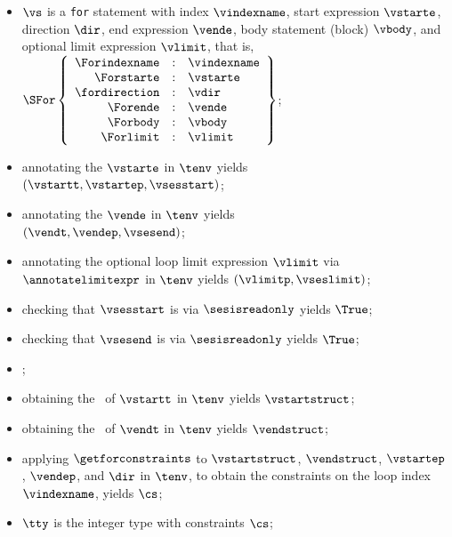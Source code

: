 \ProseParagraph
\AllApply
\begin{itemize}
  \item $\vs$ is a \texttt{for} statement with index $\vindexname$,
        start expression $\vstarte$,
        direction $\dir$,
        end expression $\vende$,
        body statement (block) $\vbody$,
        and optional limit expression $\vlimit$,
        that is, $\SFor\left\{\begin{array}{rcl}
          \Forindexname &:& \vindexname\\
          \Forstarte &:& \vstarte\\
          \fordirection &:& \vdir\\
          \Forende &:& \vende\\
          \Forbody &:& \vbody\\
          \Forlimit &:& \vlimit
        \end{array}\right\}$;
  \item annotating the \rhsexpression{} $\vstarte$ in $\tenv$ yields \\
        $(\vstartt, \vstartep, \vsesstart)$\ProseOrTypeError;
  \item annotating the \rhsexpression{} $\vende$ in $\tenv$ yields \\ $(\vendt, \vendep, \vsesend)$\ProseOrTypeError;
  \item annotating the optional loop limit expression $\vlimit$ via $\annotatelimitexpr$ in $\tenv$
        yields $(\vlimitp, \vseslimit)$\ProseOrTypeError;
  \item checking that $\vsesstart$ is \readonly{} via $\sesisreadonly$ yields $\True$\ProseOrTypeError;
  \item checking that $\vsesend$ is \readonly{} via $\sesisreadonly$ yields $\True$\ProseOrTypeError;
  \item {};
  \item obtaining the \underlyingtype\ of $\vstartt$ in $\tenv$ yields $\vstartstruct$\ProseOrTypeError;
  \item obtaining the \underlyingtype\ of $\vendt$ in $\tenv$ yields $\vendstruct$\ProseOrTypeError;
  \item applying $\getforconstraints$ to $\vstartstruct$, $\vendstruct$,
        $\vstartep$, $\vendep$, and $\dir$ in $\tenv$,
        to obtain the constraints on the loop index $\vindexname$,
        yields $\cs$\ProseOrTypeError;
  \item $\tty$ is the integer type with constraints $\cs$;

\end{itemize}
